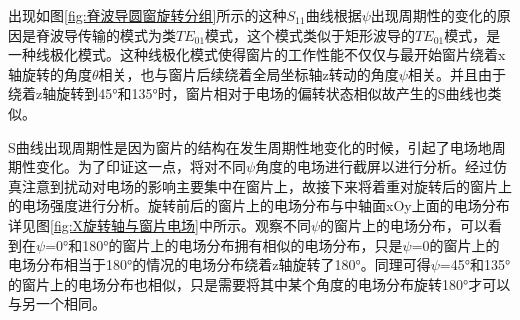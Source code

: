 \documentclass[master]{thesis-uestc}
\begin{document}
出现如图\ref{fig:脊波导圆窗旋转分组}所示的这种$S_{11}$曲线根据$\psi$出现周期性的变化的原因是脊波导传输的模式为类$TE_{01}$模式，这个模式类似于矩形波导的$TE_{01}$模式，是一种线极化模式。这种线极化模式使得窗片的工作性能不仅仅与最开始窗片绕着x轴旋转的角度$\theta$相关，也与窗片后续绕着全局坐标轴z转动的角度$\psi$相关。并且由于绕着z轴旋转到45°和135°时，窗片相对于电场的偏转状态相似故产生的S曲线也类似。

S曲线出现周期性是因为窗片的结构在发生周期性地变化的时候，引起了电场地周期性变化。为了印证这一点，将对不同\(\psi\)角度的电场进行截屏以进行分析。经过仿真注意到扰动对电场的影响主要集中在窗片上，故接下来将着重对旋转后的窗片上的电场强度进行分析。旋转前后的窗片上的电场分布与中轴面xOy上面的电场分布详见图\ref{fig:X旋转轴与窗片电场}中所示。观察不同\(\psi\)的窗片上的电场分布，可以看到在\(\psi\)=0°和180°的窗片上的电场分布拥有相似的电场分布，只是\(\psi\)=0的窗片上的电场分布相当于180°的情况的电场分布绕着z轴旋转了180°。同理可得\(\psi\)=45°和135°的窗片上的电场分布也相似，只是需要将其中某个角度的电场分布旋转180°才可以与另一个相同。
\end{document}
